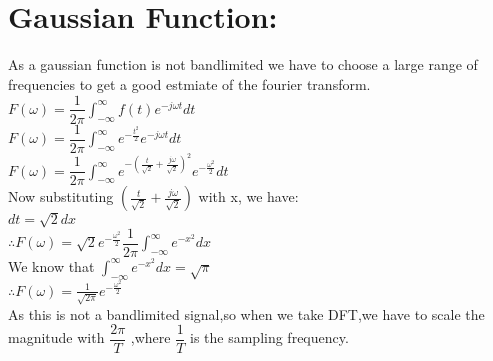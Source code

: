 \documentclass[11pt]{article}
\begin{document}
    \begin{center}
    \end{center}
    { \hspace*{\fill} \\}
    
    \begin{center}
    \end{center}
    { \hspace*{\fill} \\}
    
    \hypertarget{gaussian-function}{%
\section{Gaussian Function:}\label{gaussian-function}}

As a gaussian function is not bandlimited we have to choose a large
range of frequencies to get a good estmiate of the fourier transform.\\
\(F(\omega)=\dfrac{1}{2\pi}\int_{-\infty}^{\infty}f(t)e^{-j\omega t}dt\)\\
\(F(\omega)=\dfrac{1}{2\pi}\int_{-\infty}^{\infty}e^{-\frac{t^2}{2}}e^{-j\omega t}dt\)\\
\(F(\omega)=\dfrac{1}{2\pi}\int_{-\infty}^{\infty}e^{-(\frac{t}{\sqrt{2}}+\frac{j\omega}{\sqrt{2}})^2}e^{-\frac{\omega^2}{2}}dt\)\\
Now substituting \((\frac{t}{\sqrt{2}}+\frac{j\omega}{\sqrt{2}})\) with
x, we have:\\ \(dt=\sqrt{2}dx\)\\
\(\therefore F(\omega)=\sqrt{2} e^{-\frac{\omega^2}{2}}\dfrac{1}{2\pi}\int_{-\infty}^{\infty}e^{-x^2}dx\)\\
We know that \(\int_{-\infty}^{\infty}e^{-x^2}dx=\sqrt{\pi}\)\\
\(\therefore F(\omega)=\frac{1}{\sqrt{2\pi}}e^{-\frac{\omega^2}{2}}\) \\As
this is not a bandlimited signal,so when we take DFT,we have to scale
the magnitude with \(\dfrac{2\pi}{T}\) ,where \(\dfrac{1}{T}\) is the
sampling frequency.
\end{document}
